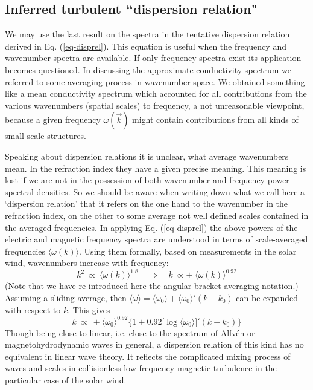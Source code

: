 \documentclass[ ]{copernicus2}
\begin{document}
{{{\subsection{Inferred turbulent ``dispersion relation"}
{We may use the last result on the spectra in the tentative dispersion relation derived in Eq. (\ref{eq-disprel}). This equation is useful when the frequency and wavenumber spectra are available. If only frequency spectra exist its application becomes questioned. In discussing the approximate conductivity spectrum we referred to some averaging process in wavenumber space. We obtained something like a mean conductivity spectrum which accounted for all contributions from the various wavenumbers (spatial scales) to frequency, a not unreasonable viewpoint, because a given frequency $\omega(\vec{k})$ might contain contributions from all kinds of small scale structures.} 

{Speaking about dispersion relations it is unclear, what average wavenumbers mean. In the refraction index they have a given precise meaning. This meaning is lost if  we are not in the possession of both wavenumber and frequency power spectral densities. So we should be aware when writing down what we call here a `dispersion relation' that it refers on the one hand to the wavenumber in the refraction index, on the other to some average not well defined scales contained in the averaged frequencies. In applying Eq. (\ref{eq-disprel}) the above powers of the electric and magnetic frequency spectra are understood in terms of scale-averaged frequencies $\langle\omega(k)\rangle$. Using them formally, }based on measurements in the solar wind, wavenumbers increase with frequency:
\begin{equation}
k^2\ \propto\  \langle\omega(k)\rangle^{1.8}\quad \Longrightarrow\quad k\ \propto \pm\;\langle\omega(k)\rangle^{0.92}
\end{equation}
{(Note that we have re-introduced here the angular bracket averaging notation.)} Assuming a sliding average, then $\langle\omega\rangle=\langle\omega_0\rangle+\langle\omega_0\rangle'(k-k_0)$ can be expanded with respect to $k$. {This gives}
\begin{equation}
{k\ \propto\  \pm\langle\omega_0\rangle^{0.92}\big\{1+0.92\big[\log\langle\omega_0\rangle\big]'(k-k_0)\big\}}
\end{equation}
Though being close to linear, i.e. close to the spectrum of Alfv\'en or magnetohydrodynamic waves in general, a dispersion relation of this kind has no equivalent in linear wave theory. It reflects the complicated mixing process of waves and scales in collisionless low-frequency magnetic turbulence in the particular case of the solar wind.

}}}
\end{document}
